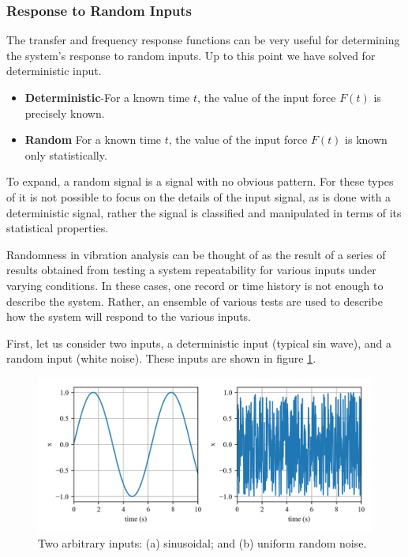 \documentclass[12pt,letter]{article}
\numberwithin{ex}{section} %
\numberwithin{re}{section} %
\numberwithin{equation}{section}	%
\begin{document}
\subsubsection{Response to Random Inputs}
The transfer and frequency response functions can be very useful for determining the system's response to random inputs. Up to this point we have solved for deterministic input. 

\begin{itemize}
\item \textbf{Deterministic}-For a known time $t$, the value of the input force $F(t)$ is precisely known. 
\item \textbf{Random} For a known time $t$, the value of the input force $F(t)$ is known only statistically. 
\end{itemize}

To expand, a random signal is a signal with no obvious pattern. For these types of it is not possible to focus on the details of the input signal, as is done with a deterministic signal, rather the signal is classified and manipulated in terms of its statistical properties. 

Randomness in vibration analysis can be thought of as the result of a series of results obtained from testing a system repeatability for various inputs under varying conditions. In these cases, one record or time history is not enough to describe the system. Rather, an ensemble of various tests are used to describe how the system will respond to the various inputs. 

First, let us consider two inputs, a deterministic input (typical sin wave), and a random input (white noise). These inputs are shown in figure \ref{fig:Response_to_random_input_inputs}. 

\begin{figure}[H]
	\centering
	\includegraphics[width=1\textwidth]{../figures/Response_to_random_input_inputs.png}
	\caption{Two arbitrary inputs: (a) sinusoidal; and (b) uniform random noise.}
	\label{fig:Response_to_random_input_inputs}
\end{figure}
\end{document}
